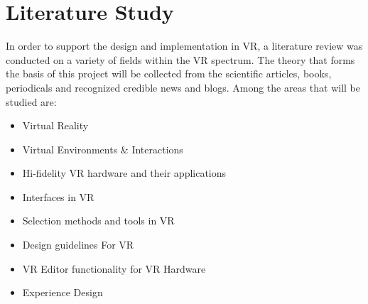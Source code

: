 \section{Literature Study}
In order to support the design and implementation in VR, a literature review was conducted on a variety of fields within the VR spectrum. The theory that forms the basis of this project will be collected from the scientific articles, books, periodicals and recognized credible news and blogs. Among the areas that will be studied are:
\begin{itemize}
\item Virtual Reality
\item Virtual Environments \& Interactions
\item Hi-fidelity VR hardware and their applications
\item Interfaces in VR
\item Selection methods and tools in VR
\item Design guidelines For VR
\item VR Editor functionality for VR Hardware
\item Experience Design
\end{itemize}



